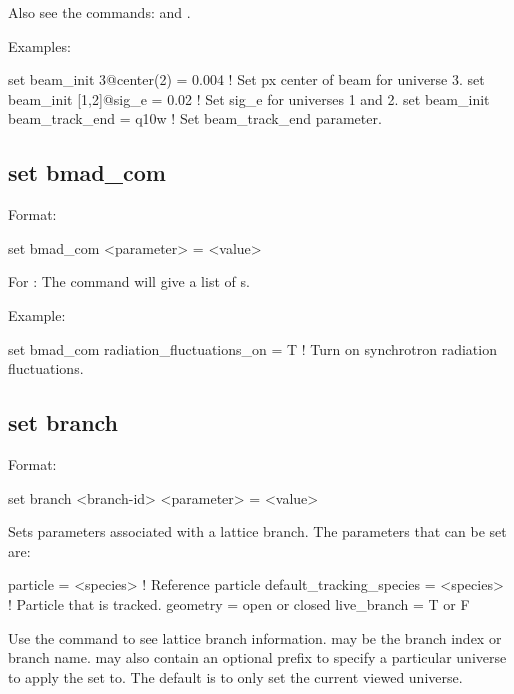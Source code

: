 {{Also see the commands:  and .

Examples:
\begin{example}
  set beam_init 3@center(2) = 0.004   ! Set px center of beam for universe 3.
  set beam_init [1,2]@sig_e = 0.02    ! Set sig_e for universes 1 and 2.
  set beam_init beam_track_end = q10w ! Set beam_track_end parameter.
\end{example}


\subsection{set bmad_com}
\label{s:set.bmad.com}

Format:
\begin{example}
  set bmad_com <parameter> = <value>
\end{example}

For : The  command will give a list of s.

Example:
\begin{example}
  set bmad_com radiation_fluctuations_on = T ! Turn on synchrotron radiation fluctuations.
\end{example}


\subsection{set branch}
\label{s:set.branch}

Format:
\begin{example}
  set branch <branch-id> <parameter> = <value>
\end{example}

Sets parameters associated with a lattice branch. The parameters that can be set are:
\begin{example}
  particle                  = <species>   ! Reference particle
  default_tracking_species  = <species>   ! Particle that is tracked.
  geometry                  = open or closed
  live_branch               = T or F
\end{example}
Use the  command to see lattice branch information.  may be the
branch index or branch name.  may also contain an optional  prefix to
specify a particular universe to apply the set to. The default is to only set the current viewed
universe.

}}
